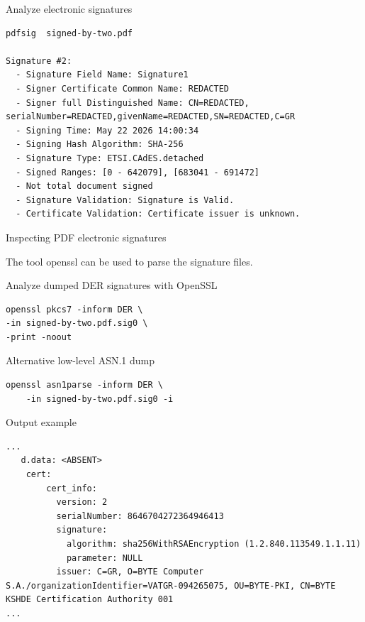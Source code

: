 \begin{frame}[fragile]{Analyze electronic signatures}
\begin{verbatim}
pdfsig  signed-by-two.pdf

Signature #2:
  - Signature Field Name: Signature1
  - Signer Certificate Common Name: REDACTED
  - Signer full Distinguished Name: CN=REDACTED,
serialNumber=REDACTED,givenName=REDACTED,SN=REDACTED,C=GR
  - Signing Time: May 22 2026 14:00:34
  - Signing Hash Algorithm: SHA-256
  - Signature Type: ETSI.CAdES.detached
  - Signed Ranges: [0 - 642079], [683041 - 691472]
  - Not total document signed
  - Signature Validation: Signature is Valid.
  - Certificate Validation: Certificate issuer is unknown.
\end{verbatim}

\end{frame}

\begin{frame}[fragile]{Inspecting PDF electronic signatures}

The tool \alert{openssl} can be used to parse the signature files.

\begin{block}{Analyze dumped DER signatures with OpenSSL}
\begin{verbatim}
openssl pkcs7 -inform DER \
-in signed-by-two.pdf.sig0 \
-print -noout
\end{verbatim}
\end{block}

\begin{block}{Alternative low-level ASN.1 dump}
\begin{verbatim}
openssl asn1parse -inform DER \
    -in signed-by-two.pdf.sig0 -i
\end{verbatim}
\end{block}

\end{frame}

\begin{frame}[fragile]
\begin{block}{Output example}
\begin{verbatim}
...
   d.data: <ABSENT>
    cert:
        cert_info:
          version: 2
          serialNumber: 8646704272364946413
          signature:
            algorithm: sha256WithRSAEncryption (1.2.840.113549.1.1.11)
            parameter: NULL
          issuer: C=GR, O=BYTE Computer S.A./organizationIdentifier=VATGR-094265075, OU=BYTE-PKI, CN=BYTE KSHDE Certification Authority 001
...
\end{verbatim}
\end{block}
\end{frame}

